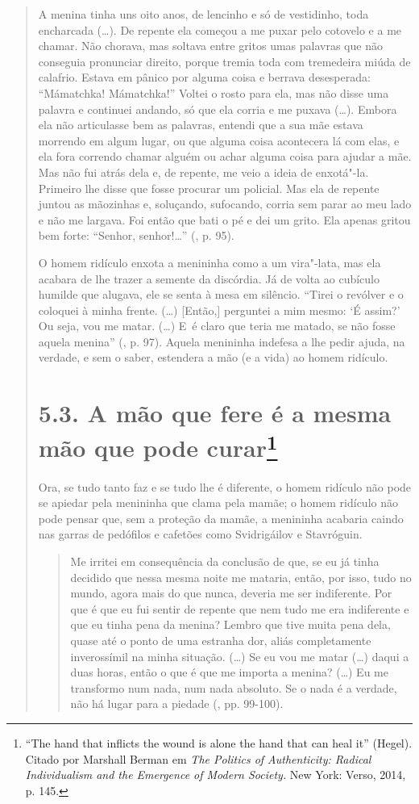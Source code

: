 {\begin{quote}
A menina tinha uns oito anos, de lencinho e só de vestidinho, toda
encharcada (\ldots{}). De repente ela começou a me puxar pelo cotovelo e
a me chamar. Não chorava, mas soltava entre gritos umas palavras que não
conseguia pronunciar direito, porque tremia toda com tremedeira miúda de
calafrio. Estava em pânico por alguma coisa e berrava desesperada:
``Mámatchka! Mámatchka!'' Voltei o rosto para ela, mas não disse uma
palavra e continuei andando, só que ela corria e me puxava (\ldots{}).
Embora ela não articulasse bem as palavras, entendi que a sua mãe estava
morrendo em algum lugar, ou que alguma coisa acontecera lá com elas, e
ela fora correndo chamar alguém ou achar alguma coisa para ajudar a mãe.
Mas não fui atrás dela e, de repente, me veio a ideia de enxotá"-la.
Primeiro lhe disse que fosse procurar um policial. Mas ela de repente
juntou as mãozinhas e, soluçando, sufocando, corria sem parar ao meu
lado e não me largava. Foi então que bati o pé e dei um grito. Ela
apenas gritou bem forte: ``Senhor, senhor!\ldots{}'' (, p. 95).

O homem ridículo enxota a menininha como a um vira"-lata, mas ela acabara
de lhe trazer a semente da discórdia. Já de volta ao cubículo humilde
que alugava, ele se senta à mesa em silêncio. ``Tirei o revólver e o
coloquei à minha frente. (\ldots{}) {[}Então,{]} perguntei a mim mesmo:
`É assim?' Ou seja, vou me matar. (\ldots{}) E~é claro que teria me
matado, se não fosse aquela menina'' (, p. 97). Aquela menininha
indefesa a lhe pedir ajuda, na verdade, e sem o saber, estendera a mão
(e a vida) ao homem ridículo.

\section{5.3. A mão que fere é a mesma mão que pode curar\protect\footnote{``The hand that inflicts the wound is alone the hand that can heal it'' (Hegel). Citado por Marshall Berman em \emph{The Politics of Authenticity: Radical Individualism and the Emergence of Modern Society.} New York: Verso, 2014, p. 145.}}

Ora, se tudo tanto faz e se tudo lhe é diferente, o homem ridículo não
pode se apiedar pela menininha que clama pela mamãe; o homem ridículo
não pode pensar que, sem a proteção da mamãe, a menininha acabaria
caindo nas garras de pedófilos e cafetões como Svidrigáilov e
Stavróguin.

\begin{quote}
Me irritei em consequência da conclusão de que, se eu já tinha decidido
que nessa mesma noite me mataria, então, por isso, tudo no mundo, agora
mais do que nunca, deveria me ser indiferente. Por que é que eu fui
sentir de repente que nem tudo me era indiferente e que eu tinha pena da
menina? Lembro que tive muita pena dela, quase até o ponto de uma
estranha dor, aliás completamente inverossímil na minha situação.
(\ldots{}) Se eu vou me matar (\ldots{}) daqui a duas horas, então o que
é que me importa a menina? (\ldots{}) Eu me transformo num nada, num
nada absoluto. Se o nada é a verdade, não há lugar para a piedade (,
pp. 99-100).
\end{quote}


\end{quote}}
